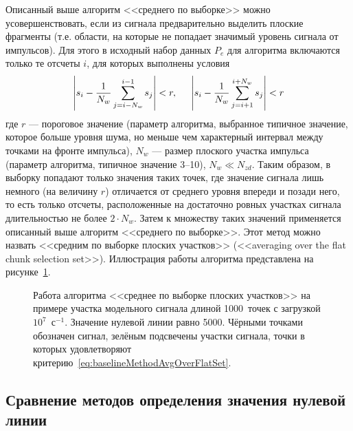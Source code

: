 Описанный выше алгоритм <<среднего по выборке>> можно усовершенствовать, если из сигнала предварительно выделить плоские фрагменты (т.е. области, на которые не попадает значимый уровень сигнала от импульсов). Для этого в исходный набор данных $P_e$ для алгоритма включаются только те отсчеты $i$, для которых выполнены условия
\begin{equation}
  \label{eq:baselineMethodAvgOverFlatSet}
  \left|  s_i - \frac{1}{N_w} \sum \limits_{j=i-N_w}^{i-1} s_j  \right| < r, \hspace{5mm}
  \left|  s_i - \frac{1}{N_w} \sum \limits_{j=i+1}^{i+N_w} s_j  \right| < r 
\end{equation}
где $r$ --- пороговое значение (параметр алгоритма, выбранное типичное значение, которое больше уровня шума, но меньше чем характерный интервал между точками на фронте импульса), $N_w$ --- размер плоского участка импульса (параметр алгоритма, типичное значение 3--10), $N_w \ll N_{zd}$. Таким образом, в выборку попадают только значения таких точек, где значение сигнала лишь немного (на величину $r$) отличается от среднего уровня впереди и позади него, то есть только отсчеты, расположенные на достаточно ровных участках сигнала длительностью не более $2 \cdot N_w$. Затем к множеству таких значений применяется описанный выше алгоритм <<среднего по выборке>>. Этот метод можно назвать <<средним по выборке плоских участков>> (<<averaging over the flat chunk selection set>>). Иллюстрация работы алгоритма представлена на рисунке~\ref{fig:baselineMethodAvgOverFlatSet}.~\cite{Khilkevitch2020}

\begin{figure}[ht!!]
  \caption{ Работа алгоритма <<среднее по выборке плоских участков>> на примере участка модельного сигнала длиной 1000~точек с загрузкой $10^7$~с${}^{-1}$. Значение нулевой линии равно 5000. Чёрными точками обозначен сигнал, зелёным подсвечены участки сигнала, точки в которых удовлетворяют критерию~\ref{eq:baselineMethodAvgOverFlatSet}.~\cite{Khilkevitch2020}}
  \label{fig:baselineMethodAvgOverFlatSet}
\end{figure}


\subsection{Сравнение методов определения значения нулевой линии}

